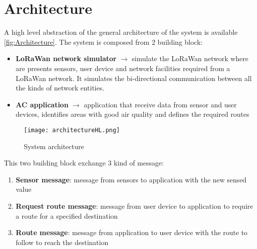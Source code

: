 \chapter{Architecture}
A high level abstraction of the general architecture of the system is available \autoref{fig:Architecture}.
The system is composed from 2 building block:
\begin{itemize}
    \item \textbf{LoRaWan network simulator} $\rightarrow$ simulate the LoRaWan network where are presents sensors, user device and network facilities required from a LoRaWan network. It simulates the bi-directional communication between all the kinds of network entities.
    \item \textbf{AC application} $\rightarrow$ application that receive data from sensor and user devices, identifies areas with good air quality and defines the required routes
\end{itemize}

\begin{figure}[h]
    \centering
    \texttt{[image: architectureHL.png]}
    \caption{System architecture}
    \label{fig:Architecture}
\end{figure}

This two building block exchange 3 kind of message:
\begin{enumerate}
    \item \textbf{Sensor message}: message from sensors to application with the new sensed value
    \item \textbf{Request route message}: message from user device to application to require a route for a specified destination
    \item \textbf{Route message}: message from application to user device with the route to follow to reach the destination
\end{enumerate}

